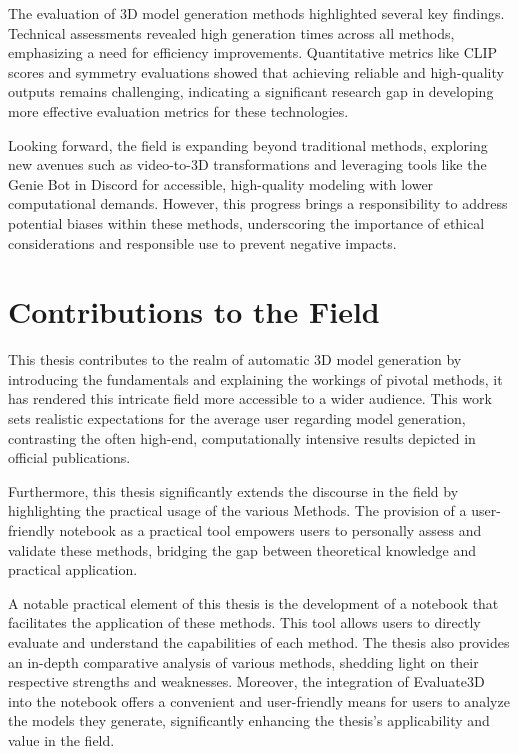 The evaluation of 3D model generation methods highlighted several key findings. Technical assessments revealed high generation times across all methods, emphasizing a need for efficiency improvements. Quantitative metrics like CLIP scores and symmetry evaluations showed that achieving reliable and high-quality outputs remains challenging, indicating a significant research gap in developing more effective evaluation metrics for these technologies.

Looking forward, the field is expanding beyond traditional methods, exploring new avenues such as video-to-3D transformations and leveraging tools like the Genie Bot in Discord for accessible, high-quality modeling with lower computational demands. However, this progress brings a responsibility to address potential biases within these methods, underscoring the importance of ethical considerations and responsible use to prevent negative impacts.

\section{Contributions to the Field}

This thesis contributes to the realm of automatic 3D model generation by introducing the fundamentals and explaining the workings of pivotal methods, it has rendered this intricate field more accessible to a wider audience. This work sets realistic expectations for the average user regarding model generation, contrasting the often high-end, computationally intensive results depicted in official publications.

Furthermore, this thesis significantly extends the discourse in the field by highlighting the practical usage of the various Methods. The provision of a user-friendly notebook as a practical tool empowers users to personally assess and validate these methods, bridging the gap between theoretical knowledge and practical application.

A notable practical element of this thesis is the development of a notebook that facilitates the application of these methods. This tool allows users to directly evaluate and understand the capabilities of each method. The thesis also provides an in-depth comparative analysis of various methods, shedding light on their respective strengths and weaknesses. Moreover, the integration of Evaluate3D into the notebook offers a convenient and user-friendly means for users to analyze the models they generate, significantly enhancing the thesis's applicability and value in the field.